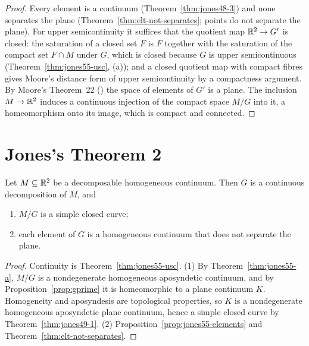 \begin{proof}
Every element is a continuum (Theorem~\ref{thm:jones48-3}) and none separates the plane (Theorem~\ref{thm:elt-not-separates}; points do not separate
the plane). For upper semicontinuity it suffices that the quotient map $\mathbb{R}^2\to G'$ is closed: the saturation of a closed set $F$ is $F$ together with
the saturation of the compact set $F\cap M$ under $G$, which is closed because $G$ is upper semicontinuous (Theorem~\ref{thm:jones55-usc},
(a)); and a closed quotient map with compact fibres gives Moore's distance form of upper semicontinuity by a compactness argument.
By Moore's Theorem~22 () the space of elements of $G'$ is a plane. The inclusion $M\to\mathbb{R}^2$ induces a continuous injection of the
compact space $M/G$ into it, a homeomorphism onto its image, which is compact and connected.
\end{proof}


\section{Jones's Theorem 2}

\begin{theorem}\label{thm:jones55-2}
Let $M\subseteq\mathbb{R}^2$ be a decomposable homogeneous continuum. Then $G$ is a continuous decomposition of $M$, and
\begin{enumerate}[label=(\arabic*)]
\item $M/G$ is a simple closed curve;
\item each element of $G$ is a homogeneous continuum that does not separate the plane.
\end{enumerate}
\end{theorem}

\begin{proof}
Continuity is Theorem~\ref{thm:jones55-usc}. (1) By Theorem~\ref{thm:jones55-a}, $M/G$ is a nondegenerate homogeneous aposyndetic continuum, and by
Proposition~\ref{prop:gprime} it is homeomorphic to a plane continuum $K$. Homogeneity and aposyndesis are topological properties, so $K$ is a nondegenerate
homogeneous aposyndetic plane continuum, hence a simple closed curve by Theorem~\ref{thm:jones49-1}. (2) Proposition~\ref{prop:jones55-elements} and
Theorem~\ref{thm:elt-not-separates}.
\end{proof}


